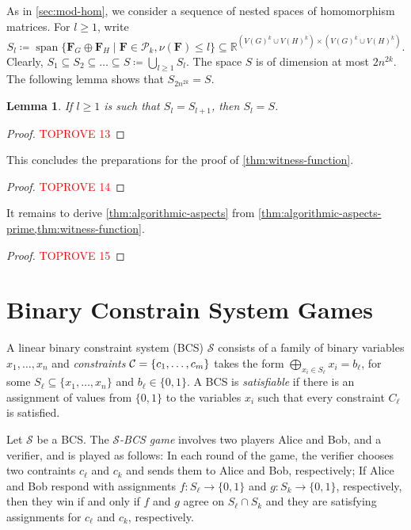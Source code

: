 \documentclass[11pt,a4paper]{article}
\theoremstyle{plain}
\newtheorem{lem}[thm]{Lemma}
\theoremstyle{remark}
\theoremstyle{definition}
\DeclareMathOperator{\spn}{span}
\def\calS{{\mathcal S}} \def\calT{{\mathcal T}} \def\calU{{\mathcal U}}
\begin{document}
As in \cref{sec:mod-hom}, we consider a sequence of nested spaces of homomorphism matrices. For $l \geq 1$, write
\[
	S_l \coloneqq \spn \{ \boldsymbol{F}_G \oplus \boldsymbol{F}_H \mid \boldsymbol{F} \in \mathcal{P}_k, \nu(\boldsymbol{F}) \leq l \} 
	\subseteq \mathbb{R}^{(V(G)^k \cup V(H)^k) \times (V(G)^k \cup V(H)^k)}.
\]
Clearly, $S_1 \subseteq S_2 \subseteq \dots \subseteq S \coloneqq \bigcup_{l \geq 1} S_l$.
The space $S$ is of dimension at most $2n^{2k}$.
The following lemma shows that $S_{2n^{2k}} = S$.

\begin{lem} \label{lem:chain-collapse}
	If $l \geq 1$ is such that $S_l = S_{l+1}$,
	then $S_l = S$.
\end{lem}
\begin{proof}\textcolor{red}{TOPROVE 13}\end{proof}

This concludes the preparations for the proof of \cref{thm:witness-function}.
\begin{proof}\textcolor{red}{TOPROVE 14}\end{proof}


It remains to derive \cref{thm:algorithmic-aspects} from \cref{thm:algorithmic-aspects-prime,thm:witness-function}. 

\begin{proof}\textcolor{red}{TOPROVE 15}\end{proof}

\iffalse
\section{Binary Constrain System Games}

A linear binary constraint system (BCS) $\calS$ consists of a family of binary variables $x_1,\dots,x_n$ and \emph{constraints} ${\mathcal C} = \{c_1,\dots,c_m\}$ takes the form $\bigoplus_{x_i\in S_\ell}x_i = b_\ell$, for some $S_\ell \subseteq \{x_1,\dots,x_n\}$ and $b_\ell \in \{0, 1\}$.
A BCS is \emph{satisfiable} if there is an assignment of values from $\{0,1\}$ to the variables $x_i$ such that every constraint $C_\ell$ is satisfied.

Let $\calS$ be a BCS.
The \emph{$\calS$-BCS game} involves two players Alice and Bob, and a verifier, and is played as follows: In each round of the game, the verifier chooses two contraints $c_\ell$ and $c_k$ and sends them to Alice and Bob, respectively; If Alice and Bob respond with assignments $f \colon S_\ell\to \{0,1\}$ and $g\colon S_k\to\{0,1\}$, respectively, then they win if and only if $f$ and $g$ agree on $S_\ell\cap S_k$ and they are satisfying assignments for $c_\ell$ and $c_k$, respectively.
\end{document}
